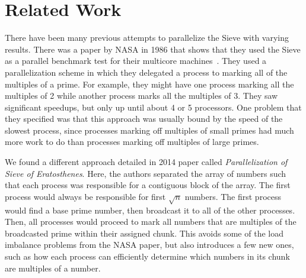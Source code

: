 \documentclass[11pt]{article}
\begin{document}
\section {Related Work}\label{rel}



There have been many previous attempts to parallelize the Sieve with
varying results. There was a paper by NASA in 1986 that shows that they
used the Sieve as a parallel benchmark test for their multicore
machines~\cite{Bohkari}.
They used a parallelization scheme in which they delegated a process to
marking all of the multiples of a prime. For example, they might have
one process marking all the multiples of 2 while another process marks
all the multiples of 3. They saw significant speedups, but only up until
about 4 or 5 processors. One problem that they specified was that this
approach was usually bound by the speed of the slowest process, since
processes marking off multiples of small primes had much more work
to do than processes marking off multiples of large primes.

We found a different approach detailed in 2014 paper called
\textit{Parallelization of Sieve of Eratosthenes}\cite{Bhat}.
Here, the authors
separated the array of numbers such that each process was responsible
for a contiguous block of the array. The first process would always
be responsible for first $\sqrt{n}$ numbers. The first process would
find a base prime number, then broadcast it to all of the other
processes. Then, all processes would proceed to mark all numbers
that are multiples of the broadcasted prime within their assigned
chunk. This avoids some of the load imbalance problems from the NASA
paper, but also introduces a few new ones, such as how each process
can efficiently determine which numbers in its chunk are multiples of
a number.
\end{document}
